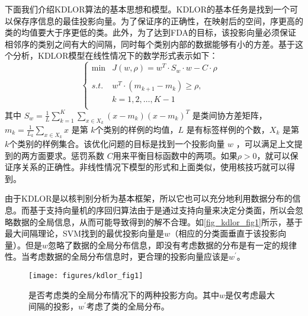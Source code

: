 下面我们介绍KDLOR算法的基本思想和模型。KDLOR的基本任务是找到一个可以保存序信息的最佳投影向量。为了保证序的正确性，在映射后的空间，序更高的类的均值要大于序更低的类。此外，为了达到FDA的目标，该投影向量必须保证相邻序的类别之间有大的间隔，同时每个类别内部的数据能够有小的方差。基于这个分析，KDLOR模型在线性情况下的数学形式表示如下：
\begin{equation}
\label{kdlor}
\left\{\begin{array}{rll} \min & J(w,\rho)=w^{T}\cdot S_{w}\cdot w-C\cdot \rho& \\
\\
s.t. & w^{T}\cdot (m_{k+1}-m_{k})\geq\rho,{} \\
     & k = 1,2,\dots,K-1\\
\end{array}
\right.
\end{equation}
其中 \(S_{w} = \frac{1}{L}\sum_{k=1}^{K}\sum_{x\in X_{k}}(x-m_{k})(x-m_{k})^{T}\) 是类间协方差矩阵，\(m_{k}=\frac{1}{L_{k}}\sum_{x\in X_{k}}x\) 是第 \(k\)个类别的样例的均值，\(L\) 是有标签样例的个数，\(X_{k}\) 是第\(k\)个类别的样例集合。该优化问题的目标是找到一个投影向量 \(w\) ，可以满足上文提到的两方面要求。惩罚系数 \(C\)用来平衡目标函数中的两项。如果\(\rho>0\)，就可以保证序关系的正确性。非线性情况下模型的形式和上面类似，使用核技巧就可以得到。

由于KDLOR是以核判别分析为基本框架，所以它也可以充分地利用数据分布的信息。而基于支持向量机的序回归算法由于是通过支持向量来决定分类面，所以会忽略数据的全局信息，从而可能导致得到的解不合理\citep{sun2010kernel}。如\autoref{fig_kdlor_fig1}所示，基于最大间隔理论，SVM找到的最优投影向量是\(w\)（相应的分类面垂直于该投影向量）。但是\(w\)忽略了数据的全局分布信息，即没有考虑数据的分布是有一定的规律性。当考虑数据的全局分布信息时，更合理的投影向量应该是\(w^{'}\)。


\begin{figure}[htb]
   \centering
   \texttt{[image: figures/kdlor\_fig1]}
\caption{是否考虑类的全局分布情况下的两种投影方向\citep{sun2010kernel}。其中$w$是仅考虑最大间隔的投影，$w^{'}$考虑了类的全局分布。}
\label{fig_kdlor_fig1}
\end{figure}

